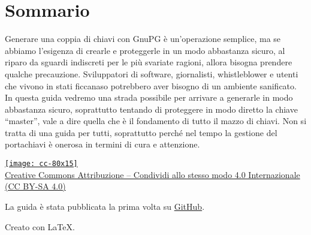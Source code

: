 \thispagestyle{empty}

\setcounter{page}{2}

\begingroup
	\section*{Sommario}

	Generare una coppia di chiavi con GnuPG è un’operazione semplice, ma se
	abbiamo l’esigenza di crearle e proteggerle in un modo abbastanza sicuro, al
	riparo da sguardi indiscreti per le più svariate ragioni, allora bisogna
	prendere qualche precauzione. Sviluppatori di software, giornalisti,
	whistleblower e utenti che vivono in stati ficcanaso potrebbero aver bisogno
	di un ambiente sanificato. In questa guida vedremo una strada possibile per
	arrivare a generarle in modo abbastanza sicuro, soprattutto tentando di
	proteggere in modo diretto la chiave “master”, vale a dire quella che è il
	fondamento di tutto il mazzo di chiavi. Non si tratta di una guida per
	tutti, soprattutto perché nel tempo la gestione del portachiavi è onerosa in
	termini di cura e attenzione.\bigskip

	\vfill

	\footnotesize

	\noindent\href{https://creativecommons.org/licenses/by-sa/4.0/deed.it}{\texttt{[image: cc-80x15]}\\
	Creative Commons Attribuzione -- Condividi allo stesso modo 4.0
	Internazionale (CC BY-SA 4.0)}\bigskip

	\noindent La guida è stata pubblicata la prima volta su
	\href{https://github.com/aldolat/generazione-sicura-chiavi-openpgp}{GitHub}.\bigskip

	\noindent Creato con \LaTeX.

\endgroup